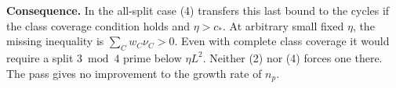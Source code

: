 \documentclass[11pt]{article}
\begin{document}
\textbf{Consequence.} In the all-split case (4) transfers this last bound
to the cycles if the class coverage condition holds and \(\eta>c_*\).
At arbitrary small fixed \(\eta\), the missing inequality is
\(\sum_C w_C\nu_C>0\). Even with complete class coverage it would require
a split \(3\bmod4\) prime below \(\eta L^2\). Neither (2) nor (4) forces
one there. The pass gives no improvement to the growth rate of \(n_p\).
\end{document}
